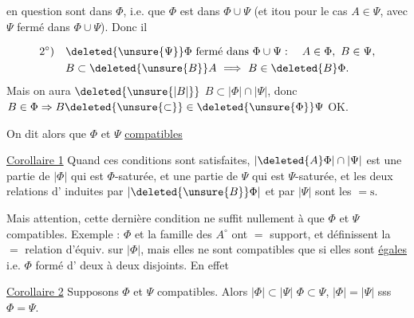 en question sont dans $\Phi$, i.e. que $\Phi$ est  dans $\Phi\cup\Psi$ (et itou pour le cas $A\in\Psi$, avec $\Psi$ fermé dans $\Phi\cup\Psi$). Donc il 

\[
\begin{aligned}
2^{\circ})\quad &\deleted{\unsure{\Psi}}\Phi\ \text{fermé dans }\Phi\cup\Psi:\quad A\in\Phi,\ B\in\Psi,\\
&B\subset\deleted{\unsure{B}}A\ \Longrightarrow\ B\in\deleted{B}\Phi.
\end{aligned}
\]
Mais on aura $\deleted{\unsure{\lvert B\rvert}}$ $B\subset\lvert\Phi\rvert\cap\lvert\Psi\rvert$, donc $B\in\Phi\Rightarrow B\deleted{\unsure{\subset}}\in\deleted{\unsure{\Phi}}\Psi$ OK.

\uline{} On dit alors que $\Phi$ et $\Psi$ \uline{compatibles}

\uline{Corollaire 1} Quand ces conditions sont satisfaites, $\lvert\deleted{A}\Phi\rvert\cap\lvert\Psi\rvert$ est une partie de $\lvert\Phi\rvert$ qui est $\Phi$-saturée, et une partie de $\Psi$ qui est $\Psi$-saturée, et les deux relations d' induites par $\lvert\deleted{\unsure{B}}\Phi\rvert$ et par $\lvert\Psi\rvert$ sont les $=\mathrm{s}$.

Mais attention, cette dernière condition ne suffit nullement à  que $\Phi$ et $\Psi$ compatibles. Exemple : $\Phi$ et la famille \inserted{$\Phi^{\circ}$} des $A^{\circ}$ ont $=$ support, et définissent la $=$ relation d'équiv. sur $\lvert\Phi\rvert$, mais elles ne sont compatibles que si elles sont \uline{égales}  i.e. $\Phi$ formé d' deux à deux disjoints. En effet 

\uline{Corollaire 2} Supposons $\Phi$ et $\Psi$ compatibles. Alors $\lvert\Phi\rvert\subset\lvert\Psi\rvert$  $\Phi\subset\Psi$, $\lvert\Phi\rvert=\lvert\Psi\rvert$ sss $\Phi=\Psi$.
